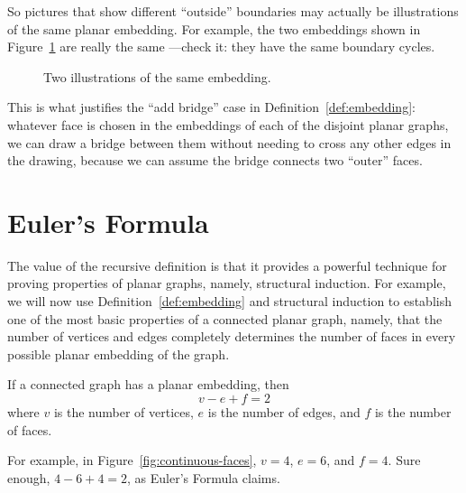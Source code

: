So pictures that show different ``outside'' boundaries may actually be
illustrations of the same planar embedding.  For example, the two
embeddings shown in Figure~\ref{fig:5DE} are really the same ---check
it: they have the same boundary cycles.

\begin{figure}


\caption{Two illustrations of the same embedding.}
\label{fig:5DE}
\end{figure}

This is what justifies the ``add bridge'' case in
Definition~\ref{def:embedding}: whatever face is chosen in the
embeddings of each of the disjoint planar graphs, we can draw a
bridge between them without needing to cross any other edges in the
drawing, because we can assume the bridge connects two ``outer''
faces.

\begin{problems}
\practiceproblems
{}

\end{problems}


\section{Euler's Formula}

The value of the recursive definition is that it provides a powerful
technique for proving properties of planar graphs, namely, structural
induction.  For example, we will now use
Definition~\ref{def:embedding} and structural induction to establish
one of the most basic properties of a connected planar graph, namely,
that the number of vertices and edges completely determines the number
of faces in every possible planar embedding of the graph.

\begin{theorem}\label{thm:eulers_formula}
If a connected graph has a planar embedding, then
\begin{equation*}
    v - e + f = 2
\end{equation*}
where $v$ is the number of vertices, $e$ is the number of edges, and
$f$ is the number of faces.
\end{theorem}

For example, in Figure~\ref{fig:continuous-faces}, $v = 4$,
$e = 6$, and $f = 4$.  Sure enough, $4 - 6 + 4 = 2$, as Euler's
Formula claims.

